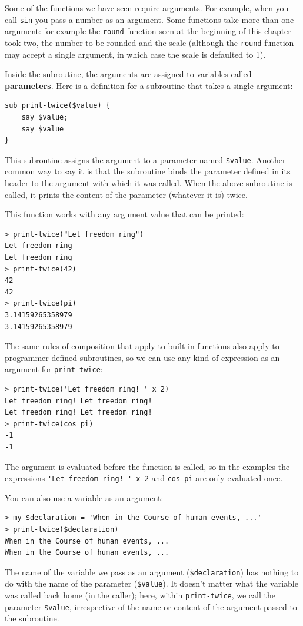 Some of the functions we have seen require arguments.  For
example, when you call {\tt sin} you pass a number
as an argument.  Some functions take more than one argument:
for example the {\tt round} function seen at the beginning 
of this chapter took two, the number to be rounded and 
the scale (although the {\tt round} function may accept a single argument, in which case the scale is defaulted to 1).

Inside the subroutine, the arguments are assigned to
variables called {\bf parameters}.  Here is a definition for
a subroutine that takes a single argument:

\begin{verbatim}
sub print-twice($value) {
    say $value;
    say $value
}
\end{verbatim}
%
This subroutine assigns the argument to a parameter
named \verb"$value". Another common way to say it is 
that the subroutine binds the parameter defined in its 
header to the argument with which it was called. When the 
above subroutine is called, it prints the content of the 
parameter (whatever it is) twice.

This function works with any argument value that can be printed:

\begin{verbatim}
> print-twice("Let freedom ring")
Let freedom ring
Let freedom ring
> print-twice(42)
42
42
> print-twice(pi)
3.14159265358979
3.14159265358979
\end{verbatim}
%
The same rules of composition that apply to built-in functions also
apply to programmer-defined subroutines, so we can use any kind of expression
as an argument for \verb"print-twice":

\begin{verbatim}
> print-twice('Let freedom ring! ' x 2)
Let freedom ring! Let freedom ring! 
Let freedom ring! Let freedom ring! 
> print-twice(cos pi)
-1
-1
\end{verbatim}
%
The argument is evaluated before the function is called, so
in the examples the expressions \verb"'Let freedom ring! ' x 2" 
and {\tt cos pi} are only evaluated once.

You can also use a variable as an argument:

\begin{verbatim}
> my $declaration = 'When in the Course of human events, ...'
> print-twice($declaration)
When in the Course of human events, ...
When in the Course of human events, ...
\end{verbatim}
%
The name of the variable we pass as an argument (\verb"$declaration") 
has nothing to do with the name of the parameter (\verb"$value"). It
doesn't matter what the variable was called back home (in the caller);
here, within \verb"print-twice", we call the parameter \verb"$value", 
irrespective of the name or content of the argument passed to the 
subroutine.


